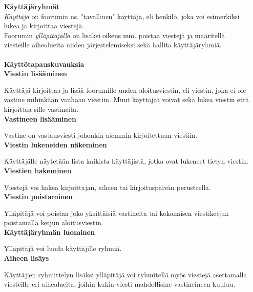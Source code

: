 \documentclass[12pt,a4paper,leqno]{report}
\begin{document}
\Large\textbf{Käyttäjäryhmät}\normalsize\\

\emph{Käyttäjä} on foorumin ns. "tavallinen"  käyttäjä, eli henkilö, joka voi esimerkiksi lukea ja kirjoittaa viestejä.\\

Foorumin \emph{ylläpitäjällä} on lisäksi oikeus mm. poistaa viestejä ja määritellä viesteille aihealueita niiden järjestelemiseksi sekä hallita käyttäjäryhmiä.\\ \\

\Large\textbf{Käyttötapauskuvauksia}\normalsize\\

\textbf{Viestin lisääminen}

\noindent Käyttäjä kirjoittaa ja lisää foorumille uuden aloitusviestin, eli viestin, joka ei ole vastine mihinkään vanhaan viestiin. Muut käyttäjät voivat sekä lukea viestin että kirjoittaa sille vastineita.\\

\textbf{Vastineen lisääminen}

\noindent Vastine on vastausviesti johonkin aiemmin kirjoitettuun viestiin.\\

\textbf{Viestin lukeneiden näkeminen}

\noindent Käyttäjälle näytetään lista kaikista käyttäjistä, jotka ovat lukeneet tietyn viestin.\\

\textbf{Viestien hakeminen}

\noindent Viestejä voi hakea kirjoittajan, aiheen tai kirjoituspäivän perusteella.\\

\textbf{Viestin poistaminen}

\noindent Ylläpitäjä voi poistaa joko yksittäisiä vastineita tai kokonaisen viestiketjun poistamalla ketjun aloitusviestin.\\

\textbf{Käyttäjäryhmän luominen}

\noindent Ylläpitäjä voi luoda käyttäjille ryhmiä.\\

\textbf{Aiheen lisäys}

\noindent Käyttäjien ryhmittelyn lisäksi ylläpitäjä voi ryhmitellä myös viestejä asettamalla viesteille eri aihealueita, joihin kukin viesti mahdollisine vastineineen kuuluu.\\
\end{document}
